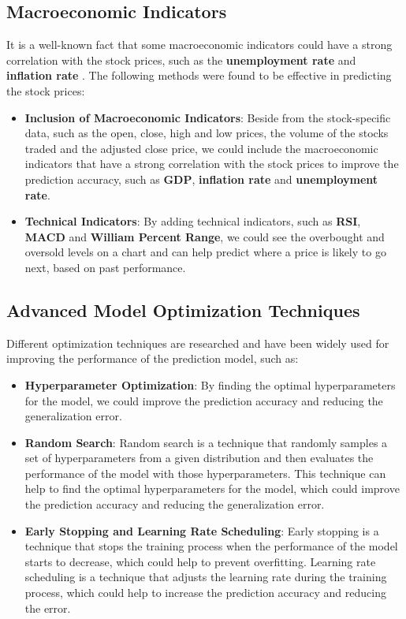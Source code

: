\documentclass[11pt]{article}
\begin{document}
\subsection{Macroeconomic Indicators}
It is a well-known fact that some macroeconomic indicators could have a strong correlation with the stock prices, such as the \textbf{unemployment rate} and \textbf{inflation rate} \cite{Haque2023-kt}.
The following methods were found to be effective in predicting the stock prices:
\begin{itemize}
    \item \textbf{Inclusion of Macroeconomic Indicators}: Beside from the stock-specific data, such as the open, close, high and low prices, the volume of the stocks traded and the adjusted close price,
    we could include the macroeconomic indicators that have a strong correlation with the stock prices to improve the prediction accuracy, such as \textbf{GDP}, \textbf{inflation rate} and \textbf{unemployment rate}. \cite{Haque2023-kt}
    \item \textbf{Technical Indicators}: By adding technical indicators, such as \textbf{RSI}, \textbf{MACD} and \textbf{William Percent Range}, we could see the overbought and oversold levels on a chart and can
    help predict where a price is likely to go next, based on past performance. \cite{Cutkovic_undated-fh}
\end{itemize}

\subsection{Advanced Model Optimization Techniques}
Different optimization techniques are researched and have been widely used for improving the performance of the prediction model, such as:
\begin{itemize}
    \item \textbf{Hyperparameter Optimization}: By finding the optimal hyperparameters for the model, we could improve the prediction accuracy and reducing the generalization error. \cite{Bergstra2012-gr}
    \item \textbf{Random Search}: Random search is a technique that randomly samples a set of hyperparameters from a given distribution and then evaluates the performance of the model with those hyperparameters.
    This technique can help to find the optimal hyperparameters for the model, which could improve the prediction accuracy and reducing the generalization error. \cite{Bergstra2012-gr}
    \item \textbf{Early Stopping and Learning Rate Scheduling}: Early stopping is a technique that stops the training process when the performance of the model starts to decrease, which could help to prevent overfitting.
    Learning rate scheduling is a technique that adjusts the learning rate during the training process, which could help to increase the prediction accuracy and reducing the error.
\end{itemize}
\end{document}
